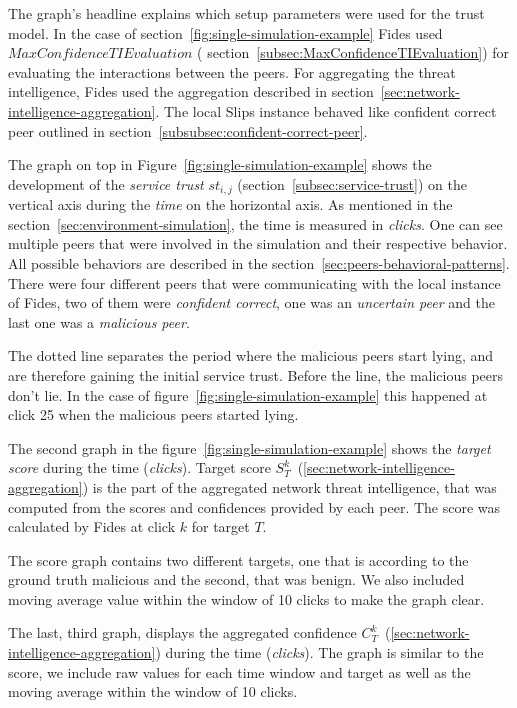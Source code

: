 The graph's headline explains which setup parameters were used for the trust model. In the case of section~\ref{fig:single-simulation-example} Fides used $MaxConfidenceTIEvaluation$ ( section~\ref{subsec:MaxConfidenceTIEvaluation}) for evaluating the interactions between the peers.
For aggregating the threat intelligence, Fides used the aggregation described in  section~\ref{sec:network-intelligence-aggregation}.
The local Slips instance behaved like confident correct peer outlined in  section~\ref{subsubsec:confident-correct-peer}.

The graph on top in Figure~\ref{fig:single-simulation-example} shows the development of the \textit{service trust} $st_{i, j}$ (section~\ref{subsec:service-trust}) on the vertical axis during the \textit{time} on the horizontal axis. As mentioned in the section~\ref{sec:environment-simulation}, the time is measured in \textit{clicks}.
One can see multiple peers that were involved in the simulation and their respective behavior. All possible behaviors are described in the section~\ref{sec:peers-behavioral-patterns}.
There were four different peers that were communicating with the local instance of Fides, two of them were \textit{confident correct}, one was an \textit{uncertain peer} and the last one was a \textit{malicious peer}.

The dotted line separates the period where the malicious peers start lying, and are therefore gaining the initial service trust. Before the line, the malicious peers don't lie.
In the case of figure~\ref{fig:single-simulation-example} this happened at click 25 when the malicious peers started lying.

The second graph in the figure~\ref{fig:single-simulation-example} shows the \textit{target score} during the time (\textit{clicks}).
Target score $S^{k}_{T}$~(\ref{sec:network-intelligence-aggregation}) is the part of the aggregated network threat intelligence, that was computed from the scores and confidences provided by each peer.
The score was calculated by Fides at click $k$ for target $T$.

The score graph contains two different targets, one that is according to the ground truth malicious and the second, that was benign.
We also included moving average value within the window of 10 clicks to make the graph clear.

The last, third graph, displays the aggregated confidence $C^{k}_{T}$~(\ref{sec:network-intelligence-aggregation}) during the time (\textit{clicks}).
The graph is similar to the score, we include raw values for each time window and target as well as the moving average within the window of 10 clicks.


